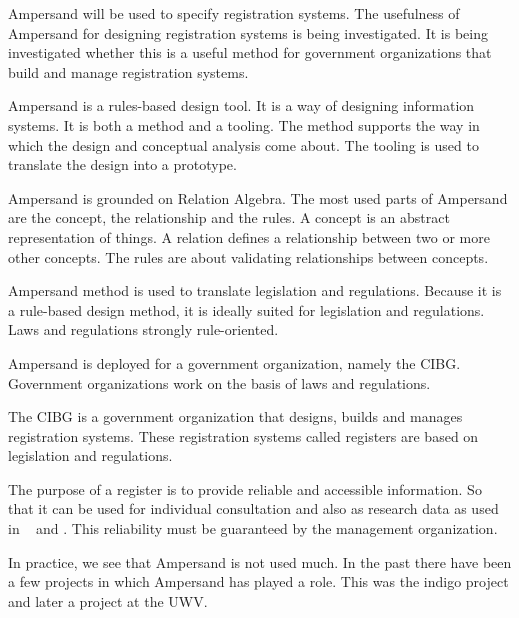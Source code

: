 Ampersand will be used to specify registration systems.
The usefulness of Ampersand for designing registration systems is being investigated.
It is being investigated whether this is a useful method for government organizations that build and manage registration systems.

Ampersand is a rules-based design tool.
It is a way of designing information systems.
It is both a method and a tooling.
The method supports the way in which the design and conceptual analysis come about.
The tooling is used to translate the design into a prototype.

Ampersand is grounded on Relation Algebra.
The most used parts of Ampersand are the concept, the relationship and the rules.
A concept is an abstract representation of things.
A relation defines a relationship between two or more other concepts.
The rules are about validating relationships between concepts.

Ampersand method is used to translate legislation and regulations.
Because it is a rule-based design method, it is ideally suited for legislation and regulations.
Laws and regulations strongly rule-oriented.

Ampersand is deployed for a government organization, namely the CIBG.
Government organizations work on the basis of laws and regulations.

The CIBG is a government organization that designs, builds and manages registration systems.
These registration systems called registers are based on legislation and regulations.

The purpose of a register is to provide reliable and accessible information.
So that it can be used for individual consultation and also as research data as used in ~\cite{schmidt_danish_2015} and \cite{bakken_norwegian_2019}.
This reliability must be guaranteed by the management organization.

In practice, we see that Ampersand is not used much.
In the past there have been a few projects in which Ampersand has played a role.
This was the \acrlong{indigo} project and later a project at the UWV.


